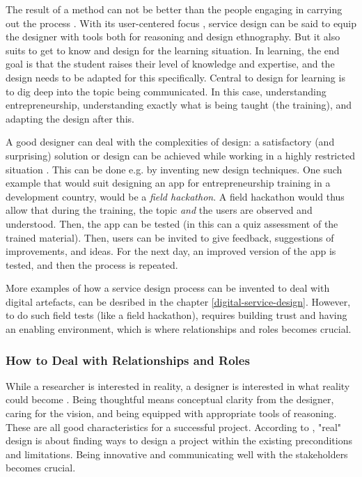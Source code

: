 The result of a method can not be better than the people engaging in carrying out the process \citep{lowgren}. With its user-centered focus \citep{stickdorn}, service design can be said to equip the designer with tools both for reasoning and design ethnography. But it also suits to get to know and design for the learning situation. In learning, the end goal is that the student raises their level of knowledge and expertise, and the design needs to be adapted for this specifically. Central to design for learning is to dig deep into the topic being communicated. In this case, understanding entrepreneurship, understanding exactly what is being taught (the training), and adapting the design after this.

A good designer can deal with the complexities of design: a satisfactory (and surprising) solution or design can be achieved while working in a highly restricted situation \citep{lowgren}. This can be done e.g. by inventing new design techniques. One such example that would suit designing an app for entrepreneurship training in a development country, would be a \textit{field hackathon}. A field hackathon would thus allow that during the training, the topic \textit{and} the users are observed and understood. Then, the app can be tested (in this can a quiz assessment of the trained material). Then, users can be invited to give feedback, suggestions of improvements, and  ideas. For the next day, an improved version of the app is tested, and then the process is repeated.

More examples of how a service design process can be invented to deal with digital artefacts, can be desribed in the chapter \ref{digital-service-design}. However, to do such field tests (like a field hackathon), requires building trust and having an enabling environment, which is where relationships and roles becomes crucial.

\subsubsection{How to Deal with Relationships and Roles}
While a researcher is interested in reality, a designer is interested in what reality could become \citep{lowgren}. Being thoughtful means conceptual clarity from the designer, caring for the vision, and being equipped with appropriate tools of reasoning. These are all good characteristics for a successful project. According to \cite{lowgren}, "real" design is about finding ways to design a project within the existing preconditions and limitations. Being innovative and communicating well with the stakeholders becomes crucial.

